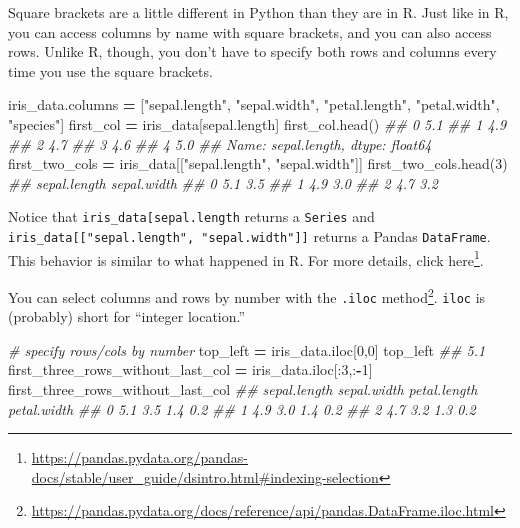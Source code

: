 \documentclass[
  12pt,
  krantz2]{krantz}
\makeatletter
\newenvironment{Shaded}{\begin{snugshade}}{\end{snugshade}}
\newcommand{\CommentTok}[1]{\textcolor[rgb]{0.37,0.37,0.37}{\textit{#1}}}
\newcommand{\DecValTok}[1]{\textcolor[rgb]{0.06,0.06,0.06}{#1}}
\newcommand{\NormalTok}[1]{#1}
\newcommand{\OperatorTok}[1]{\textcolor[rgb]{0.43,0.43,0.43}{\textbf{#1}}}
\newcommand{\StringTok}[1]{\textcolor[rgb]{0.5,0.5,0.5}{#1}}
\renewcommand{\href}[2]{#2\footnote{\url{#1}}}
\newenvironment{kframe}{%
\medskip{}
\setlength{\fboxsep}{.8em}
 \def\at@end@of@kframe{}%
 \ifinner\ifhmode%
  \def\at@end@of@kframe{\end{minipage}}%
  \begin{minipage}{\columnwidth}%
 \fi\fi%
 \def\FrameCommand##1{\hskip\@totalleftmargin \hskip-\fboxsep
 \colorbox{shadecolor}{##1}\hskip-\fboxsep
     \hskip-\linewidth \hskip-\@totalleftmargin \hskip\columnwidth}%
 \MakeFramed {\advance\hsize-\width
   \@totalleftmargin\z@ \linewidth\hsize
   \@setminipage}}%
 {\par\unskip\endMakeFramed%
 \at@end@of@kframe}
\renewenvironment{Shaded}{\begin{kframe}}{\end{kframe}}
\makeatother
\begin{document}
Square brackets are a little different in Python than they are in R. Just like in R, you can access columns by name with square brackets, and you can also access rows. Unlike R, though, you don't have to specify both rows and columns every time you use the square brackets.

\begin{Shaded}
\begin{Highlighting}[]
\NormalTok{iris\_data.columns }\OperatorTok{=}\NormalTok{ [}\StringTok{"sepal.length"}\NormalTok{, }\StringTok{"sepal.width"}\NormalTok{, }\StringTok{"petal.length"}\NormalTok{, }
                     \StringTok{"petal.width"}\NormalTok{, }\StringTok{"species"}\NormalTok{]}
\NormalTok{first\_col }\OperatorTok{=}\NormalTok{ iris\_data[}\StringTok{\textquotesingle{}sepal.length\textquotesingle{}}\NormalTok{]}
\NormalTok{first\_col.head()}
\CommentTok{\#\# 0    5.1}
\CommentTok{\#\# 1    4.9}
\CommentTok{\#\# 2    4.7}
\CommentTok{\#\# 3    4.6}
\CommentTok{\#\# 4    5.0}
\CommentTok{\#\# Name: sepal.length, dtype: float64}
\NormalTok{first\_two\_cols }\OperatorTok{=}\NormalTok{ iris\_data[[}\StringTok{"sepal.length"}\NormalTok{, }\StringTok{"sepal.width"}\NormalTok{]]}
\NormalTok{first\_two\_cols.head(}\DecValTok{3}\NormalTok{)}
\CommentTok{\#\#    sepal.length  sepal.width}
\CommentTok{\#\# 0           5.1          3.5}
\CommentTok{\#\# 1           4.9          3.0}
\CommentTok{\#\# 2           4.7          3.2}
\end{Highlighting}
\end{Shaded}

Notice that \texttt{iris\_data{[}\textquotesingle{}sepal.length\textquotesingle{}{]}} returns a \texttt{Series} and \texttt{iris\_data{[}{[}"sepal.length",\ "sepal.width"{]}{]}} returns a Pandas \texttt{DataFrame}. This behavior is similar to what happened in R. For more details, click \href{https://pandas.pydata.org/pandas-docs/stable/user_guide/dsintro.html\#indexing-selection}{here}.

You can select columns and rows by number with the \href{https://pandas.pydata.org/docs/reference/api/pandas.DataFrame.iloc.html}{\texttt{.iloc} method}. \texttt{iloc} is (probably) short for ``integer location.''

\begin{Shaded}
\begin{Highlighting}[]
\CommentTok{\# specify rows/cols by number}
\NormalTok{top\_left }\OperatorTok{=}\NormalTok{ iris\_data.iloc[}\DecValTok{0}\NormalTok{,}\DecValTok{0}\NormalTok{]}
\NormalTok{top\_left}
\CommentTok{\#\# 5.1}
\NormalTok{first\_three\_rows\_without\_last\_col }\OperatorTok{=}\NormalTok{ iris\_data.iloc[:}\DecValTok{3}\NormalTok{,:}\OperatorTok{{-}}\DecValTok{1}\NormalTok{]}
\NormalTok{first\_three\_rows\_without\_last\_col}
\CommentTok{\#\#    sepal.length  sepal.width  petal.length  petal.width}
\CommentTok{\#\# 0           5.1          3.5           1.4          0.2}
\CommentTok{\#\# 1           4.9          3.0           1.4          0.2}
\CommentTok{\#\# 2           4.7          3.2           1.3          0.2}
\end{Highlighting}
\end{Shaded}
\end{document}
